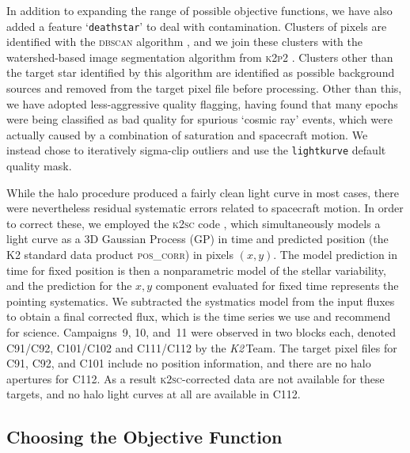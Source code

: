 \documentclass[modern]{aastex62}
\newcommand\ktwo{\emph{K2}\,}
\begin{document}

In addition to expanding the range of possible objective functions, we have also added a feature `\texttt{deathstar}' to deal with contamination. Clusters of pixels are identified with the \textsc{dbscan} algorithm \citep[Density-Based Spatial Clustering of Applications with Noise;][]{dbscan}, and we join these clusters with the watershed-based image segmentation algorithm from \textsc{k2p2} \citep{k2p2}. Clusters other than the target star identified by this algorithm are identified as possible background sources and removed from the target pixel file before processing. Other than this, we have adopted less-aggressive quality flagging, having found that many epochs were being classified as bad quality for spurious `cosmic ray' events, which were actually caused by a combination of saturation and spacecraft motion. We instead chose to iteratively sigma-clip outliers and use the \texttt{lightkurve} \citep{lightkurve} default quality mask.

While the halo procedure produced a fairly clean light curve in most cases, there were nevertheless residual systematic errors related to spacecraft motion. In order to correct these, we employed the \textsc{k2sc} code \citep{Aigrain2015,k2sc}, which simultaneously models a light curve as a 3D Gaussian Process (GP) in time and predicted position (the K2 standard data product \textsc{pos\_corr}) in pixels $(x,y)$. The model prediction in time for fixed position is then a nonparametric model of the stellar variability, and the prediction for the $x,y$ component evaluated for fixed time represents the pointing systematics. We subtracted the systmatics model from the input fluxes to obtain a final corrected flux, which is the time series we use and recommend for science. Campaigns~9, 10, and~11 were observed in two blocks each, denoted C91/C92, C101/C102 and C111/C112 by the \ktwo Team. The target pixel files for C91, C92, and C101 include no position information, and there are no halo apertures for C112. As a result \textsc{k2sc}-corrected data are not available for these targets, and no halo light curves at all are available in C112.

\subsection{Choosing the Objective Function}
\label{sec:objective}
\end{document}
